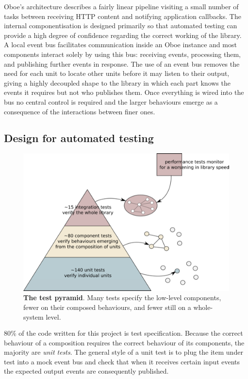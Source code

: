 \documentclass[12pt, ]{article}
\makeatletter
\def\maxwidth{\ifdim\Gin@nat@width>\linewidth\linewidth
\else\Gin@nat@width\fi}
\let\Oldincludegraphics\includegraphics
\renewcommand{\includegraphics}[1]{\Oldincludegraphics[width=\maxwidth]{#1}}
\makeatother
\begin{document}
Oboe's architecture describes a fairly linear pipeline visiting a small
number of tasks between receiving HTTP content and notifying application
callbacks. The internal componentisation is designed primarily so that
automated testing can provide a high degree of confidence regarding the
correct working of the library. A local event bus facilitates
communication inside an Oboe instance and most components interact
solely by using this bus: receiving events, processing them, and
publishing further events in response. The use of an event bus removes
the need for each unit to locate other units before it may listen to
their output, giving a highly decoupled shape to the library in which
each part knows the events it requires but not who publishes them. Once
everything is wired into the bus no central control is required and the
larger behaviours emerge as a consequence of the interactions between
finer ones.

\subsection{Design for automated
testing}\label{design-for-automated-testing}

\begin{figure}[htbp]
\centering
\includegraphics{images/testPyramid.png}
\caption{\textbf{The test pyramid}. Many tests specify the low-level
components, fewer on their composed behaviours, and fewer still on a
whole-system level. \label{testpyramid}}
\end{figure}

80\% of the code written for this project is test specification. Because
the correct behaviour of a composition requires the correct behaviour of
its components, the majority are \emph{unit tests}. The general style of
a unit test is to plug the item under test into a mock event bus and
check that when it receives certain input events the expected output
events are consequently published.
\end{document}
